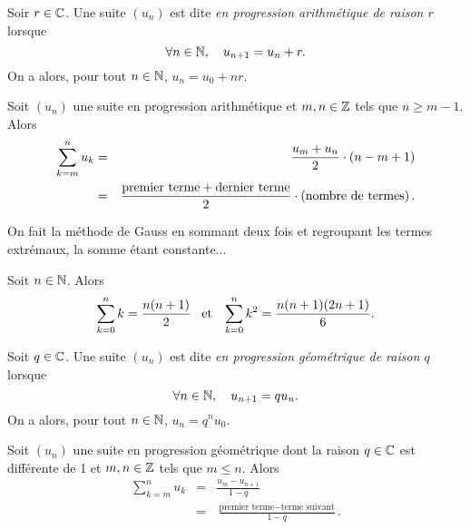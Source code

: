 \documentclass{magnolia}
\begin{document}
\begin{definition}
Soir $r\in\mathbb{C}$. Une suite $(u_n)$ est dite \emph{en progression arithmétique de raison $r$} lorsque
\[\forall n \in \mathbb{N},\quad  u_{n+1}= u_n+r.\]
On a alors, pour tout $n \in \mathbb{N}$, $u_n = u_0 + nr$.
\end{definition}

\begin{proposition}
Soit $(u_n)$ une suite en progression arithmétique et $m,n\in\mathbb{Z}$ tels que $n\geq m-1$. Alors
\begin{eqnarray*}
\sum_{k=m}^n u_k
&=& \frac{u_m + u_n}{2}\cdot\left(n-m+1\right)\\
&=& \frac{\text{premier terme}+\text{dernier terme}}{2}\cdot
    \left(\text{nombre de termes}\right).
\end{eqnarray*}
\end{proposition}

\begin{preuve}
On fait la méthode de Gauss en sommant deux fois et regroupant les termes extrémaux, la somme étant constante...
\end{preuve}

\begin{proposition}
Soit $n\in\mathbb{N}$. Alors
\[\sum_{k=0}^n k=\frac{n(n+1)}{2} \quad\!\text{et}\quad\! \sum_{k=0}^n k^2=\frac{n(n+1)(2n+1)}{6}.\]
\end{proposition}


\begin{definition}
Soit $q\in\mathbb{C}$. Une suite $(u_n)$ est dite \emph{en progression géométrique de raison $q$} lorsque
\[\forall n \in \mathbb{N},\quad  u_{n+1}= q u_n.\]
On a alors, pour tout $n \in \mathbb{N}$, $u_n = q^n u_0$.
\end{definition}

\begin{proposition}
Soit $(u_n)$ une suite en progression géométrique dont la raison $q\in\mathbb{C}$ est différente de 1 et $m,n\in\mathbb{Z}$ tels que $m\leq n$. Alors
\begin{eqnarray*}
\sum_{k=m}^n u_k
&=& \frac{u_m - u_{n+1}}{1-q}\\
&=& \frac{\text{premier terme}-\text{terme suivant}}{1-q}.
\end{eqnarray*}
\end{proposition}
\end{document}
